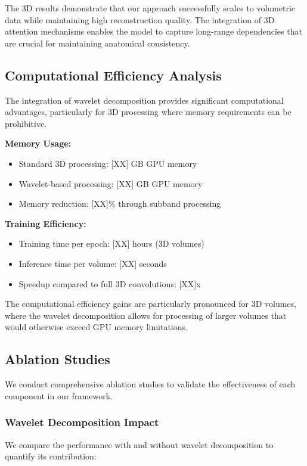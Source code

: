\documentclass{midl} %
\begin{document}
The 3D results demonstrate that our approach successfully scales to volumetric data while maintaining high reconstruction quality. The integration of 3D attention mechanisms enables the model to capture long-range dependencies that are crucial for maintaining anatomical consistency.

\subsection{Computational Efficiency Analysis}

The integration of wavelet decomposition provides significant computational advantages, particularly for 3D processing where memory requirements can be prohibitive.

\textbf{Memory Usage:}
\begin{itemize}
\item Standard 3D processing: [XX] GB GPU memory
\item Wavelet-based processing: [XX] GB GPU memory
\item Memory reduction: [XX]\% through subband processing
\end{itemize}

\textbf{Training Efficiency:}
\begin{itemize}
\item Training time per epoch: [XX] hours (3D volumes)
\item Inference time per volume: [XX] seconds
\item Speedup compared to full 3D convolutions: [XX]x
\end{itemize}

The computational efficiency gains are particularly pronounced for 3D volumes, where the wavelet decomposition allows for processing of larger volumes that would otherwise exceed GPU memory limitations.

\subsection{Ablation Studies}

We conduct comprehensive ablation studies to validate the effectiveness of each component in our framework.

\subsubsection{Wavelet Decomposition Impact}

We compare the performance with and without wavelet decomposition to quantify its contribution:
\end{document}
